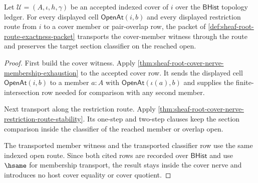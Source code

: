 \begin{theorem}
\label{thm:sheaf-root-route-exactness-membership-transport}
Let $\mathcal{U}=(A,\iota,h,\gamma)$ be an accepted indexed cover of $i$ over the $\mathsf{BHist}$ topology ledger. For every displayed cell $\mathsf{OpenAt}(i,b)$ and every displayed restriction route from $i$ to a cover member or pair-overlap row, the packet of \autoref{def:sheaf-root-route-exactness-packet} transports the cover-member witness through the route and preserves the target section classifier on the reached open.
\end{theorem}
\begin{proof}
First build the cover witness. Apply \autoref{thm:sheaf-root-cover-nerve-membership-exhaustion} to the accepted cover row. It sends the displayed cell $\mathsf{OpenAt}(i,b)$ to a member $a:A$ with $\mathsf{OpenAt}(\iota(a),b)$ and supplies the finite-intersection row needed for comparison with any second member.

Next transport along the restriction route. Apply \autoref{thm:sheaf-root-cover-nerve-restriction-route-stability}. Its one-step and two-step clauses keep the section comparison inside the classifier of the reached member or overlap open.

The transported member witness and the transported classifier row use the same indexed open route. Since both cited rows are recorded over $\mathsf{BHist}$ and use $\hsame$ for membership transport, the result stays inside the cover nerve and introduces no host cover equality or cover quotient.
\end{proof}

